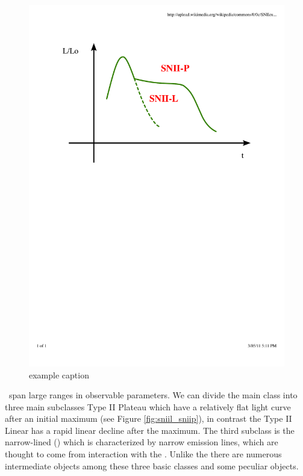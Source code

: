 \begin{figure}[htbp] %
   \centering
   \includegraphics[width=\textwidth]{chapter_intro/plots/snii_lc_comparison.pdf} 
   \caption{example caption}
   \label{fig:snii_lc_comparison}
\end{figure}


\sneii\ span large ranges in observable parameters. We can divide the main class into three main subclasses Type II Plateau \citet[\sniip][]{1979A&A....72..287B} which have a relatively flat light curve after an initial maximum (see Figure \ref{fig:sniil_sniip}), in contrast the Type II Linear \cite[\sniil][]{1990MNRAS.244..269S} has a rapid linear decline after the maximum. The third subclass is the narrow-lined \snii (\sniin) which is characterized by narrow emission lines, which are thought to come from interaction with the \csm. Unlike the \sneia there are numerous intermediate objects among these three basic classes and some peculiar objects.


